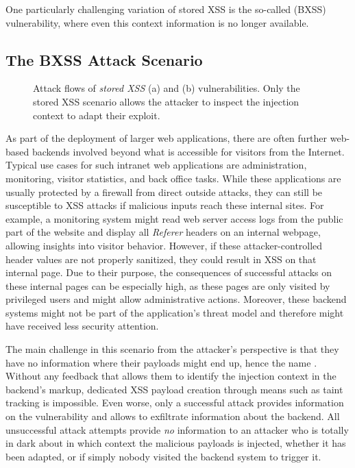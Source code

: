 One particularly challenging variation of stored XSS is the so-called \emph{\blindxss{}} (BXSS) vulnerability, where even this context information is no longer available. %

\subsection{The BXSS Attack Scenario}
\begin{figure}[tb]
\centering
{}
\qquad
{}\vspace{-1.5mm}
\caption{Attack flows of \emph{stored XSS} (a) and \emph{\blindxss{}} (b) vulnerabilities. Only the stored XSS scenario allows the attacker to inspect the injection context to adapt their exploit.}\label{fig:xss}
\end{figure}

As part of the deployment of larger web applications, there are often further web-based backends involved beyond what is accessible for visitors from the Internet.
Typical use cases for such intranet web applications are administration, monitoring, visitor statistics, and back office tasks.
While these applications are usually protected by a firewall from direct outside attacks, they can still be susceptible to XSS attacks if malicious inputs reach these internal sites.
For example, a monitoring system might read web server access logs from the public part of the website and display all \emph{Referer} headers on an internal webpage, allowing insights into visitor behavior.
However, if these attacker-controlled header values are not properly sanitized, they could result in XSS on that internal page.
Due to their purpose, the consequences of successful attacks on these internal pages can be especially high, as these pages are only visited by privileged users and might allow administrative actions.
Moreover, these backend systems might not be part of the application's threat model and therefore might have received less security attention.

The main challenge in this scenario from the attacker's perspective is that they have no information where their payloads might end up, hence the name \blindxss{}.
Without any feedback that allows them to identify the injection context in the backend's markup, dedicated XSS payload creation through means such as taint tracking is impossible.
Even worse, only a successful attack provides information on the vulnerability and allows to exfiltrate information about the backend. All unsuccessful attack attempts provide \emph{no} information to an attacker who is totally in dark about in which context the malicious payloads is injected, whether it has been adapted, or if simply nobody visited the backend system to trigger it.

